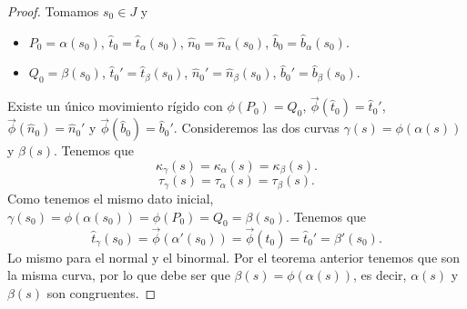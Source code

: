 \begin{proof}
Tomamos $\displaystyle s_{0} \in J $ y
\begin{itemize}
\item $\displaystyle P_{0} = \alpha\left(s_{0}\right) $, $\displaystyle \hat{t}_{0}=\hat{t}_{\alpha }\left(s_{0}\right) $, $\displaystyle \hat{n}_{0}=\hat{n}_{\alpha }\left(s_{0}\right) $, $\displaystyle \hat{b}_{0}=\hat{b }_{\alpha }\left(s_{0}\right) $.
\item $\displaystyle Q_{0}=\beta\left(s_{0}\right) $, $\displaystyle \hat{t}_{0}' = \hat{t}_{\beta }\left(s_{0}\right) $, $\displaystyle \hat{n}_{0}' = \hat{n}_{\beta }\left(s_{0}\right) $, $\displaystyle \hat{b}_{0}'=\hat{b}_{\beta }\left(s_{0}\right) $.
\end{itemize}
Existe un único movimiento rígido con $\displaystyle \phi\left(P_{0}\right)=Q_{0} $, $\displaystyle \vec{\phi}\left(\hat{t}_{0}\right)=\hat{t}_{0}' $, $\displaystyle \vec{\phi}\left(\hat{n}_{0}\right)=\hat{n}_{0}' $ y $\displaystyle \vec{\phi}\left(\hat{b}_{0}\right) =\hat{b}_{0}'$. 
Consideremos las dos curvas $\displaystyle \gamma \left(s\right)=\phi\left(\alpha \left(s\right)\right) $ y $\displaystyle \beta\left(s\right) $. Tenemos que 
\[\kappa_{\gamma }\left(s\right)=\kappa_{\alpha }\left(s\right)=\kappa_{\beta }\left(s\right) .\]
\[\tau_{\gamma }\left(s\right)=\tau_{\alpha }\left(s\right)=\tau_{\beta }\left(s\right) .\]
Como tenemos el mismo dato inicial, $\displaystyle \gamma\left(s_{0}\right)=\phi\left(\alpha\left(s_{0}\right)\right)=\phi\left(P_{0}\right)=Q_{0}=\beta\left(s_{0}\right) $. Tenemos que 
\[\hat{t}_{\gamma }\left(s_{0}\right)=\vec{\phi}\left(\alpha'\left(s_{0}\right)\right)=\vec{\phi}\left(\hat{t}_{0 }\right)=\hat{t}_{0}' = \beta'\left(s_{0}\right) .\]
Lo mismo para el normal y el binormal. Por el teorema anterior tenemos que son la misma curva, por lo que debe ser que $\displaystyle \beta\left(s\right)=\phi\left(\alpha\left(s\right)\right) $, es decir, $\displaystyle \alpha\left(s\right) $ y $\displaystyle \beta\left(s\right) $ son congruentes.
\end{proof}

